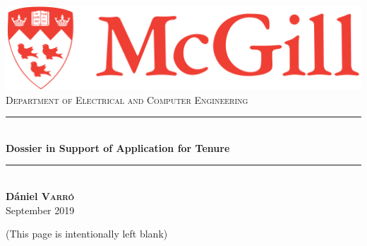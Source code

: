 \documentclass[letter,11pt]{report}
\begin{document}
\begin{titlepage}
\thispagestyle{empty}
\newcommand{\HRule}{\rule{\linewidth}{0.5mm}} %

\center %
 
\includegraphics[width=.5\textwidth]{figures/McGill-logo.png}\\[0.5cm] 

\textsc{\LARGE Department of Electrical and Computer Engineering}\\[3cm] 

\HRule \\[0.4cm]
{ \huge \bfseries Dossier in Support of Application for Tenure}\\[0.4cm] %
\HRule \\[4cm]

{\bfseries\LARGE Dániel \textsc{Varró}}\\[8cm] %


{\Large September 2019}\\[2cm] 

\vfill %
\end{titlepage}

\thispagestyle{empty}
(This page is intentionally left blank)
\newpage

\setcounter{page}{1}
{%
\small
\tableofcontents
}




%




\appendix

%
%


\newpage
\end{document}

